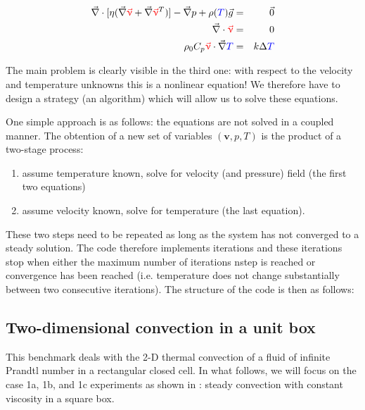 \begin{eqnarray}
{\vec \nabla}\cdot [\eta ({\vec\nabla} {\color{red}{\vec \upnu}} 
+ {\vec \nabla} {\color{red}{\vec \upnu}}^T ) ] 
- {\vec \nabla}p + \rho({\color{blue}T}) {\vec g} &=& {\vec 0}   \\
{\vec \nabla}\cdot {\color{red} {\vec \upnu}} &=& 0 \\
\rho_0 C_p {\color{red} {\vec \upnu}}\cdot {\vec \nabla} {\color{blue}T} &=& k \Delta {\color{blue}T} 
\end{eqnarray} 

The main problem is clearly visible in the third one: with respect to the velocity and 
temperature unknowns this is a nonlinear equation! 
We therefore have to design a strategy (an algorithm) which will allow us to solve these 
equations. 

One simple approach is as follows: the equations are not solved in a coupled manner. 
The obtention of a new set of variables $({\bm v},p,T)$ is the product of a two-stage process:
\begin{enumerate}
\item assume temperature known, solve for velocity (and pressure) field (the first two equations)
\item assume velocity known, solve for temperature (the last equation).
\end{enumerate}

These two steps need to be repeated as long as the system has not converged to a steady solution. 
The code therefore implements iterations and these iterations stop when either the maximum number 
of iterations nstep is reached or convergence has been reached (i.e. temperature does not change 
substantially between two consecutive iterations). The structure of the code 
is then as follows:






\subsection{Two-dimensional convection in a unit box}

This benchmark deals with the 2-D thermal convection of a fluid 
of infinite Prandtl number in a rectangular closed cell.
In what follows, we will focus on the case 1a, 1b, and 1c experiments as shown in \cite{blbc89}:
steady convection with constant viscosity in a square box.

